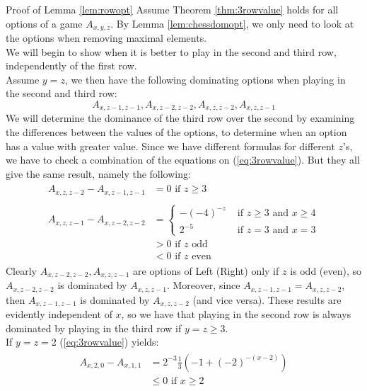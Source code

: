 \begin{proof2}{Proof of Lemma \ref{lem:rowopt}}
Assume Theorem \ref{thm:3rowvalue} holds for all options of a game $A_{x,y,z}$. By Lemma \ref{lem:chessdomopt}, we only need to look at the options when removing maximal elements.
\\
We will begin to show when it is better to play in the second and third row, independently of the first row.
\\
Assume $y=z$, we then have the following dominating options when playing in the second and third row: $$A_{x,z-1,z-1},A_{x,z-2,z-2},A_{x,z,z-2},A_{x,z,z-1}$$
We will determine the dominance of the third row over the second by examining the differences between the values of the options, to determine when an option has a value with greater value. Since we have different formulas for different $z$'s, we have to check a combination of the equations on (\ref{eq:3rowvalue}). But they all give the same result, namely the following: 
\begin{align*}
\begin{split}
A_{x,z,z-2}-A_{x,z-1,z-1}&=0\text{ if $z\ge3$}
\end{split}\\
\begin{split}
A_{x,z,z-1}-A_{x,z-2,z-2}&=\left\{
\begin{array}{ll}
-(-4)^{-z}&\text{ if $z\ge3$ and $x\ge4$}\\
2^{-5}&\text{ if $z=3$ and $x=3$}
\end{array}\right.
\\
&>0\text{ if $z$ odd}\\
&<0\text{ if $z$ even}
\end{split}
\end{align*}
Clearly $A_{x,z-2,z-2},A_{x,z,z-1}$ are options of Left (Right) only if $z$ is odd (even), so $A_{x,z-2,z-2}$ is dominated by $A_{x,z,z-1}$. Moreover, since $A_{x,z-1,z-1}=A_{x,z,z-2}$, then $A_{x,z-1,z-1}$ is dominated by $A_{x,z,z-2}$ (and vice versa). These results are evidently independent of $x$, so we have that playing in the second row is always dominated by playing in the third row if $y=z\ge3$.
\\
If $y=z=2$ (\ref{eq:3rowvalue}) yields:
\begin{align*}
\begin{split}
A_{x,2,0}-A_{x,1,1}&=2^{-3}\frac{1}{3}\left(-1+(-2)^{-(x-2)}\right)\\
&\le0\text{ if $x\ge2$}
\end{split}\\

\end{align*}
\end{proof2}
